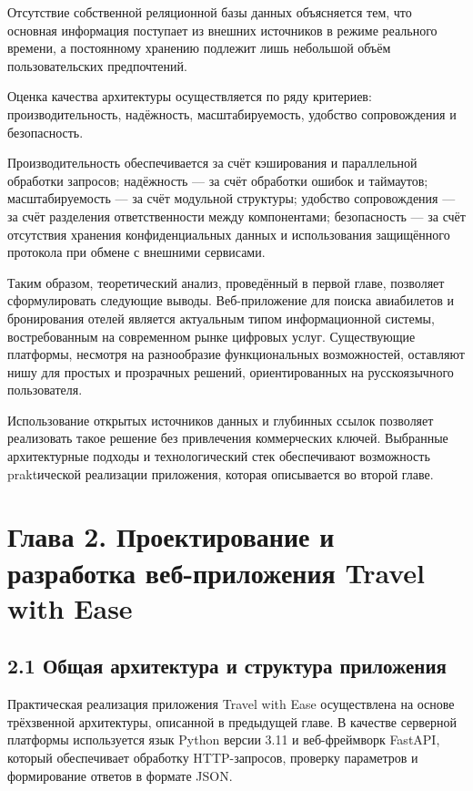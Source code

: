 \documentclass[14pt,a4paper,oneside]{extreport}
\begin{document}
Отсутствие собственной реляционной базы данных объясняется тем, что основная информация поступает из внешних источников в режиме реального времени, а постоянному хранению подлежит лишь небольшой объём пользовательских предпочтений.

Оценка качества архитектуры осуществляется по ряду критериев: производительность, надёжность, масштабируемость, удобство сопровождения и безопасность.

Производительность обеспечивается за счёт кэширования и параллельной обработки запросов; надёжность — за счёт обработки ошибок и таймаутов; масштабируемость — за счёт модульной структуры; удобство сопровождения — за счёт разделения ответственности между компонентами; безопасность — за счёт отсутствия хранения конфиденциальных данных и использования защищённого протокола при обмене с внешними сервисами.

Таким образом, теоретический анализ, проведённый в первой главе, позволяет сформулировать следующие выводы. Веб-приложение для поиска авиабилетов и бронирования отелей является актуальным типом информационной системы, востребованным на современном рынке цифровых услуг. Существующие платформы, несмотря на разнообразие функциональных возможностей, оставляют нишу для простых и прозрачных решений, ориентированных на русскоязычного пользователя.

Использование открытых источников данных и глубинных ссылок позволяет реализовать такое решение без привлечения коммерческих ключей. Выбранные архитектурные подходы и технологический стек обеспечивают возможность praktической реализации приложения, которая описывается во второй главе.


\chapter*{Глава 2. Проектирование и разработка веб-приложения Travel with Ease}


\section*{2.1 Общая архитектура и структура приложения}

Практическая реализация приложения Travel with Ease осуществлена на основе трёхзвенной архитектуры, описанной в предыдущей главе. В качестве серверной платформы используется язык Python версии 3.11 и веб-фреймворк FastAPI, который обеспечивает обработку HTTP-запросов, проверку параметров и формирование ответов в формате JSON.
\end{document}

